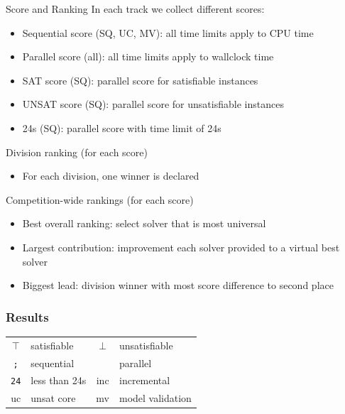 \documentclass[table]{beamer}
\def\emph#1{\textcolor{MYblue}{#1}}
\begin{document}
\begin{frame}{Score and Ranking}
  In each track we collect different scores:
  \begin{itemize}
  \item \emph{Sequential score} (SQ, UC, MV): all time limits apply to CPU time
  \item \emph{Parallel score} (all): all time limits apply to wallclock time
  \item \emph{SAT score} (SQ): parallel score for \emph{satisfiable} instances
  \item \emph{UNSAT score} (SQ): parallel score for \emph{unsatisfiable} instances
  \item \emph{24s} (SQ): parallel score with time limit of \emph{24s}
  \end{itemize}
  \bigskip

  Division ranking (for each score)
  \begin{itemize}
  \item For each division, one winner is declared
  \end{itemize}

  \bigskip

  Competition-wide rankings (for each score)
  \begin{itemize}
  \item \emph{Best overall ranking}: select solver that is most universal
  \item \emph{Largest contribution}: improvement each solver provided to a virtual best solver
  \item \emph{Biggest lead}: division winner with most score difference to second place
  \end{itemize}

\end{frame}

\newcommand{\seq}{\texttt{;}}
\newcommand{\paral}{\textbardbl}
\newcommand{\sat}{$\top$}
\newcommand{\unsat}{$\bot$}
\newcommand{\fast}{\texttt{24}}
\newcommand{\inc}{inc}
\newcommand{\uc}{uc}
\newcommand{\mv}{mv}
\newcommand{\cloud}{cloud}
\newcommand{\paralTrack}{parallel}

\begin{frame}
  \frametitle{Results}

  \begin{center}
    \begin{tabular}{|cl|cl|}
  \hline
  \sat & satisfiable & \unsat & unsatisfiable \\
  \seq & sequential & \paral & parallel \\
  \fast & less than 24s & \inc & incremental \\
  \uc & unsat core & \mv & model validation \\
  \hline
\end{tabular}
\end{center}
\end{frame}
\end{document}
